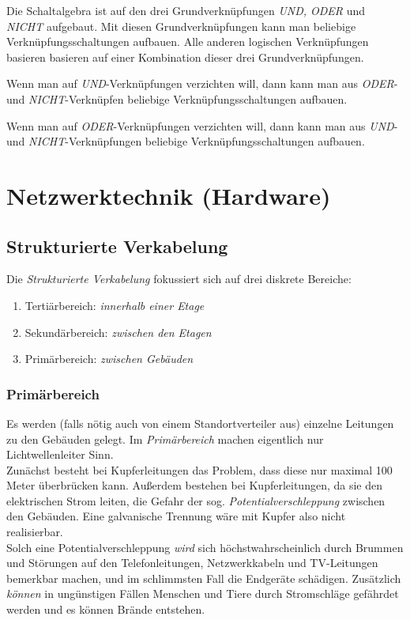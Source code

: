 \documentclass[a4paper, 12pt]{report}
\begin{document}
Die Schaltalgebra ist auf den drei Grundverknüpfungen \emph{UND, ODER} und 
\emph{NICHT} aufgebaut. Mit diesen Grundverknüpfungen kann man beliebige 
Verknüpfungsschaltungen aufbauen. Alle anderen logischen Verknüpfungen basieren 
basieren auf einer Kombination dieser drei Grundverknüpfungen. 

Wenn man auf \emph{UND}-Verknüpfungen verzichten will, dann kann man aus
\emph{ODER}- und \emph{NICHT}-Verknüpfen beliebige Verknüpfungsschaltungen 
aufbauen. 

Wenn man auf \emph{ODER}-Verknüpfungen verzichten will, dann kann man aus 
\emph{UND}- und \emph{NICHT}-Verknüpfungen beliebige Verknüpfungsschaltungen
aufbauen.


\section{Netzwerktechnik (Hardware)}
\subsection{Strukturierte Verkabelung}

Die \emph{Strukturierte Verkabelung} fokussiert sich auf drei diskrete Bereiche:
\begin{enumerate}
    \item Tertiärbereich: \emph{innerhalb einer Etage}
    \item Sekundärbereich: \emph{zwischen den Etagen}
    \item Primärbereich: \emph{zwischen Gebäuden}
\end{enumerate}

\subsubsection{Primärbereich}
Es werden (falls nötig auch von einem Standortverteiler aus) einzelne Leitungen
zu den Gebäuden gelegt. Im \emph{Primärbereich} machen eigentlich nur
Lichtwellenleiter Sinn. \\

Zunächst besteht bei Kupferleitungen das Problem, dass diese nur maximal 100
Meter überbrücken kann. Außerdem bestehen bei Kupferleitungen, da sie den 
elektrischen Strom leiten, die Gefahr der sog. \emph{Potentialverschleppung} 
zwischen den Gebäuden. Eine galvanische Trennung wäre mit Kupfer also nicht 
realisierbar. \\

Solch eine Potentialverschleppung \emph{wird} sich höchstwahrscheinlich durch 
Brummen und Störungen auf den Telefonleitungen, Netzwerkkabeln und TV-Leitungen 
bemerkbar machen, und im schlimmsten Fall die Endgeräte schädigen. Zusätzlich 
\emph{können} in ungünstigen Fällen Menschen und Tiere durch Stromschläge 
gefährdet werden und es können Brände entstehen. \\
\end{document}
